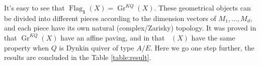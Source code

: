 \documentclass[reqno,11pt]{amsart}
\numberwithin{equation}{section}
\theoremstyle{plain}
\theoremstyle{plain}
\numberwithin{equation}{section}
\theoremstyle{remark}
\DeclareMathOperator{\Flagd}{\operatorname{Flag}_{\mathbf{d}}}
\DeclareMathOperator{\Flagdstr}{\operatorname{Flag}_{\mathbf{d},str}}
\newcommand{\Grq}{\operatorname{Gr}^{KQ}}
\newcommand{\Flag}[1]{\operatorname{Flag}_{\mathbf{#1}}}
\begin{document}
It's easy to see that $\Flag{1}(X)=\Grq(X)$. These geometrical objects can be divided into different pieces according to the dimension vectors of $M_1,\ldots,M_d$, and each piece have its own natural (complex/Zarisky) topology. It was proved in \cite{irelli2019cell} that $\Grq(X)$ have an affine paving, and in \cite{maksimau2019flag} that $\Flagd(X)$ have the same property when $Q$ is Dynkin quiver of type $A/E$. Here we go one step further, the results are concluded in the Table \ref{table:result}.


\end{document}

